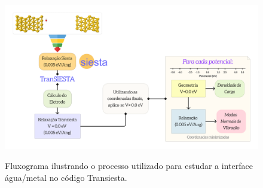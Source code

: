 \begin{figure}[h!]
	\centering
	\caption{Fluxograma ilustrando o processo utilizado para estudar a interface água/metal no código Transiesta.}
	\includegraphics[scale=0.1]{figs/neq_fluxo.png}
	\label{fig:neq_flux}
\end{figure} 



